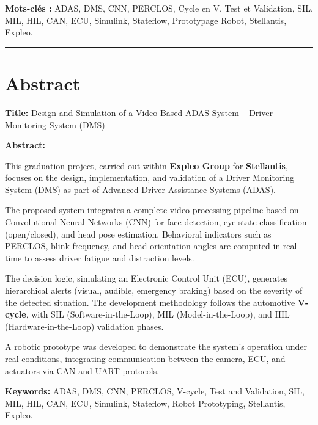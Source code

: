 \vspace{0.5cm}

\noindent\textbf{Mots-clés :} ADAS, DMS, CNN, PERCLOS, Cycle en V, Test et Validation, SIL, MIL, HIL, CAN, ECU, Simulink, Stateflow, Prototypage Robot, Stellantis, Expleo.

\vspace{1.5cm}

\noindent\rule{\textwidth}{0.4pt}

\chapter*{Abstract}

\vspace{0.5cm}

\noindent\textbf{Title:} Design and Simulation of a Video-Based ADAS System -- Driver Monitoring System (DMS)

\vspace{0.5cm}

\noindent\textbf{Abstract:}

This graduation project, carried out within \textbf{Expleo Group} for \textbf{Stellantis}, focuses on the design, implementation, and validation of a Driver Monitoring System (DMS) as part of Advanced Driver Assistance Systems (ADAS).

The proposed system integrates a complete video processing pipeline based on Convolutional Neural Networks (CNN) for face detection, eye state classification (open/closed), and head pose estimation. Behavioral indicators such as PERCLOS, blink frequency, and head orientation angles are computed in real-time to assess driver fatigue and distraction levels.

The decision logic, simulating an Electronic Control Unit (ECU), generates hierarchical alerts (visual, audible, emergency braking) based on the severity of the detected situation. The development methodology follows the automotive \textbf{V-cycle}, with SIL (Software-in-the-Loop), MIL (Model-in-the-Loop), and HIL (Hardware-in-the-Loop) validation phases.

A robotic prototype was developed to demonstrate the system's operation under real conditions, integrating communication between the camera, ECU, and actuators via CAN and UART protocols.

\vspace{0.5cm}

\noindent\textbf{Keywords:} ADAS, DMS, CNN, PERCLOS, V-cycle, Test and Validation, SIL, MIL, HIL, CAN, ECU, Simulink, Stateflow, Robot Prototyping, Stellantis, Expleo.
